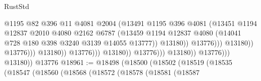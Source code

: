 \begin{lexlean}{RustStd}
\begin{coremodule}
{\begin{coremodule}
{{{{{{{{{{{{{{{{{{{{{{{{{{{{{{{                                                      @1195
                                                      @82
                                                      @396
                                                      @11
                                                      @4081
                                                      @2004
                                                      (@13491
                                                        @1195
                                                        @396
                                                        @4081
                                                        (@13451
                                                          @1194
                                                          @12837
                                                          @2010
                                                          @4080
                                                          @2162
                                                          @6787
                                                          (@13459
                                                            @1194
                                                            @12837
                                                            @4080
                                                            (@14041
                                                              @728
                                                              @180
                                                              @398
                                                              @3240
                                                              @3139
                                                              @14055
                                                              @13777))
                                                          @13180))
                                                      @13776)))
                                                @13180))
                                            @13776)))
                                      @13180))
                                  @13776)))
                            @13180))
                        @13776)))
                  @13180))
              @13776)))
        @13180))
    @13776
@18961 := @18498
    (@18500
      (@18502
        (@18519
          (@18535
            (@18547
              (@18560
                (@18568
                  (@18572
                    (@18578
                      (@18581
                        (@18587
}}}}}}}}}}}}}}}}}}}}}}}}}}}}}}}
\end{coremodule}}
\end{coremodule}
\end{lexlean}
